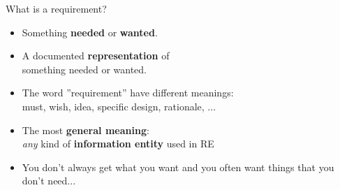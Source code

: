 
\begin{Slide}{What is a requirement?}

\begin{itemize}
\item Something \textbf{needed} or \textbf{wanted}.

\item A documented \textbf{representation} of\\something needed or wanted.
\item The word ''requirement'' have different meanings:\\
  must, wish, idea, specific design, rationale, ...

\item The most \textbf{general meaning}:\\
  \textit{any} kind of \textbf{information entity} used in RE

\item You don't always get what you want and you often want things that you don't need...

\end{itemize}
\end{Slide}